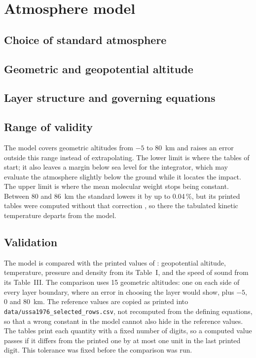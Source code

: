 \section{Atmosphere model}\label{sec:atmosphere}

\subsection{Choice of standard atmosphere}
\subsection{Geometric and geopotential altitude}
\subsection{Layer structure and governing equations}
\subsection{Range of validity}
The model covers geometric altitudes from $-5$ to $80$~km and raises an error
outside this range instead of extrapolating. The lower limit is where the
tables of \cite{ussa1976} start; it also leaves a margin below sea level for
the integrator, which may evaluate the atmosphere slightly below the ground
while it locates the impact. The upper limit is where the mean molecular
weight stops being constant. Between 80 and 86~km the standard lowers it by
up to 0.04\,\%, but its printed tables were computed without that correction
\cite[p.~9]{ussa1976}, so there the tabulated kinetic temperature departs
from the model.

\subsection{Validation}
The model is compared with the printed values of \cite{ussa1976}:
geopotential altitude, temperature, pressure and density from its Table~I,
and the speed of sound from its Table~III. The comparison uses 15 geometric
altitudes: one on each side of every layer boundary, where an error in
choosing the layer would show, plus $-5$, $0$ and $80$~km. The reference
values are copied as printed into \texttt{data/ussa1976\_selected\_rows.csv},
not recomputed from the defining equations, so that a wrong constant in the
model cannot also hide in the reference values. The tables print each
quantity with a fixed number of digits, so a computed value passes if it
differs from the printed one by at most one unit in the last printed digit.
This tolerance was fixed before the comparison was run.
